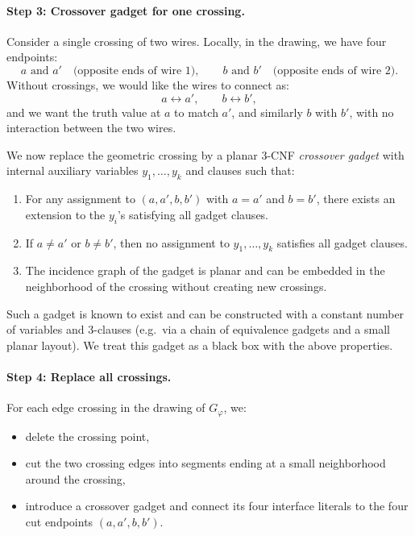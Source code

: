 \documentclass[9pt]{extarticle}
\begin{document}
\paragraph{Step 3: Crossover gadget for one crossing.}

Consider a single crossing of two wires.  Locally, in the drawing, we have four
endpoints:
\[
    a \text{ and } a' \quad\text{(opposite ends of wire 1)},
    \qquad
    b \text{ and } b' \quad\text{(opposite ends of wire 2)}.
\]
Without crossings, we would like the wires to connect as:
\[
    a \longleftrightarrow a', \qquad b \longleftrightarrow b',
\]
and we want the truth value at $a$ to match $a'$, and similarly $b$ with $b'$,
with no interaction between the two wires.

We now replace the geometric crossing by a planar 3-CNF \emph{crossover gadget}
with internal auxiliary variables $y_1,\dots,y_k$ and clauses such that:

\begin{enumerate}
    \item For any assignment to $(a,a',b,b')$ with $a = a'$ and $b = b'$, there
          exists an extension to the $y_i$'s satisfying all gadget clauses.
    \item If $a \neq a'$ or $b \neq b'$, then no assignment to $y_1,\dots,y_k$
          satisfies all gadget clauses.
    \item The incidence graph of the gadget is planar and can be embedded in the
          neighborhood of the crossing without creating new crossings.
\end{enumerate}

Such a gadget is known to exist and can be constructed with a constant number
of variables and 3-clauses (e.g.\ via a chain of equivalence gadgets and a
small planar layout).  We treat this gadget as a black box with the above
properties.

\paragraph{Step 4: Replace all crossings.}

For each edge crossing in the drawing of $G_\varphi$, we:
\begin{itemize}
    \item delete the crossing point,
    \item cut the two crossing edges into segments ending at a small
          neighborhood around the crossing,
    \item introduce a crossover gadget and connect its four interface literals
          to the four cut endpoints $(a,a',b,b')$.
\end{itemize}
\end{document}
